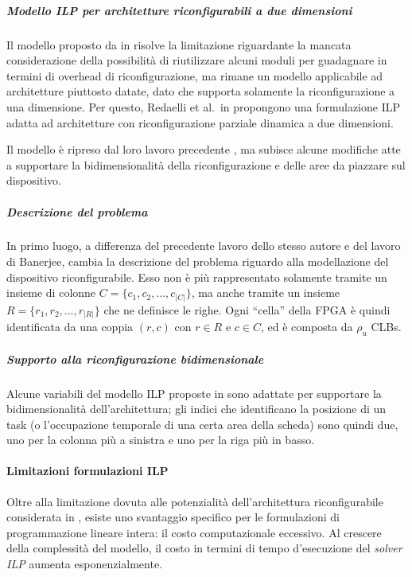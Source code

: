 \subparagraph{Modello \acs{ILP} per architetture riconfigurabili a due 
dimensioni}
Il modello proposto da in \cite{Redaelli1DILP} risolve la limitazione 
riguardante la mancata considerazione della possibilità di riutilizzare alcuni 
moduli per guadagnare in termini di overhead di riconfigurazione, ma rimane un 
modello applicabile ad architetture piuttosto datate, dato che supporta 
solamente la riconfigurazione a una dimensione. Per questo, Redaelli et al.~in 
\cite{Redaelli2DILP} propongono una formulazione \ac{ILP} adatta ad 
architetture con riconfigurazione parziale dinamica a due dimensioni.


Il modello è ripreso dal loro lavoro precedente \cite{Redaelli1DILP}, ma 
subisce alcune modifiche atte a supportare la bidimensionalità della 
riconfigurazione e delle aree da piazzare sul dispositivo.

\subparagraph{Descrizione del problema}
In primo luogo, a differenza del precedente lavoro dello stesso autore e 
del lavoro di Banerjee, cambia la descrizione del problema riguardo alla 
modellazione del dispositivo riconfigurabile. Esso non è più rappresentato 
solamente tramite un insieme di colonne $C = \{c_1,c_2,\dots,c_{\vert C 
\vert}\}$, ma anche tramite un insieme $R = \{r_1,r_2,\dots,r_{\vert R \vert}\}$ 
che ne definisce le righe. Ogni ``cella'' della \ac{FPGA} è quindi identificata 
da una coppia $(r,c)$ con $r \in R$ e $c \in C$, ed è composta da $\rho_u$ 
\acp{CLB}.

\subparagraph{Supporto alla riconfigurazione bidimensionale}
Alcune variabili del modello \ac{ILP} proposte in \cite{Redaelli1DILP} sono 
adattate per supportare la bidimensionalità dell'architettura; gli indici che 
identificano la posizione di un task (o l'occupazione temporale di una certa 
area della scheda) sono quindi due, uno per la colonna più a sinistra e uno per 
la riga più in basso.


\paragraph{Limitazioni formulazioni \acs{ILP}}
Oltre alla limitazione dovuta alle potenzialità dell'architettura 
riconfigurabile considerata in \cite{BanerjeePhysicalConstraints}, esiste uno 
svantaggio specifico per le formulazioni di programmazione lineare intera: il 
costo computazionale eccessivo. Al crescere della complessità del modello, il 
costo in termini di tempo d'esecuzione del \emph{solver \ac{ILP}} aumenta 
esponenzialmente.

